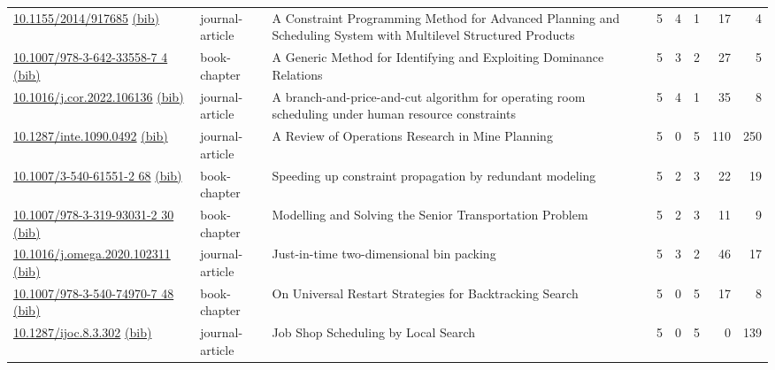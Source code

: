 {\begin{longtable}{p{5cm}lp{11cm}rrrrr}
\href{http://dx.doi.org/10.1155/2014/917685}{10.1155/2014/917685} \href{https://www.doi2bib.org/bib/10.1155/2014/917685}{(bib)} & journal-article & A Constraint Programming Method for Advanced Planning and Scheduling System with Multilevel Structured Products & 5 & 4 & 1 & 17 & 4 \\
\href{http://dx.doi.org/10.1007/978-3-642-33558-7_4}{10.1007/978-3-642-33558-7 4} \href{https://www.doi2bib.org/bib/10.1007/978-3-642-33558-7_4}{(bib)} & book-chapter & A Generic Method for Identifying and Exploiting Dominance Relations & 5 & 3 & 2 & 27 & 5 \\
\href{http://dx.doi.org/10.1016/j.cor.2022.106136}{10.1016/j.cor.2022.106136} \href{https://www.doi2bib.org/bib/10.1016/j.cor.2022.106136}{(bib)} & journal-article & A branch-and-price-and-cut algorithm for operating room scheduling under human resource constraints & 5 & 4 & 1 & 35 & 8 \\
\href{http://dx.doi.org/10.1287/inte.1090.0492}{10.1287/inte.1090.0492} \href{https://www.doi2bib.org/bib/10.1287/inte.1090.0492}{(bib)} & journal-article & A Review of Operations Research in Mine Planning & 5 & 0 & 5 & 110 & 250 \\
\href{http://dx.doi.org/10.1007/3-540-61551-2_68}{10.1007/3-540-61551-2 68} \href{https://www.doi2bib.org/bib/10.1007/3-540-61551-2_68}{(bib)} & book-chapter & Speeding up constraint propagation by redundant modeling & 5 & 2 & 3 & 22 & 19 \\
\href{http://dx.doi.org/10.1007/978-3-319-93031-2_30}{10.1007/978-3-319-93031-2 30} \href{https://www.doi2bib.org/bib/10.1007/978-3-319-93031-2_30}{(bib)} & book-chapter & Modelling and Solving the Senior Transportation Problem & 5 & 2 & 3 & 11 & 9 \\
\href{http://dx.doi.org/10.1016/j.omega.2020.102311}{10.1016/j.omega.2020.102311} \href{https://www.doi2bib.org/bib/10.1016/j.omega.2020.102311}{(bib)} & journal-article & Just-in-time two-dimensional bin packing & 5 & 3 & 2 & 46 & 17 \\
\href{http://dx.doi.org/10.1007/978-3-540-74970-7_48}{10.1007/978-3-540-74970-7 48} \href{https://www.doi2bib.org/bib/10.1007/978-3-540-74970-7_48}{(bib)} & book-chapter & On Universal Restart Strategies for Backtracking Search & 5 & 0 & 5 & 17 & 8 \\
\href{http://dx.doi.org/10.1287/ijoc.8.3.302}{10.1287/ijoc.8.3.302} \href{https://www.doi2bib.org/bib/10.1287/ijoc.8.3.302}{(bib)} & journal-article & Job Shop Scheduling by Local Search & 5 & 0 & 5 & 0 & 139 \\

\end{longtable}}
